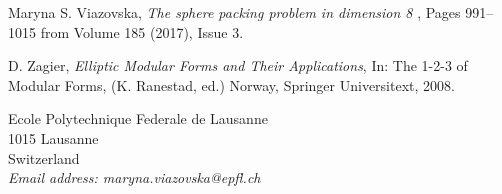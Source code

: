 \begin{thebibliography}{20}



 {\sc Maryna S. Viazovska}, {\em The sphere packing problem in dimension 8	},
Pages 991--1015 from Volume 185 (2017), Issue 3.

 {\sc D. Zagier}, {\em Elliptic Modular Forms and Their Applications}, In:  The 1-2-3 of Modular Forms, (K. Ranestad, ed.) Norway, Springer Universitext, 2008.
\end{thebibliography}

\newpage

{\footnotesize
\noindent
Ecole Polytechnique Federale de Lausanne\\
1015 Lausanne\\
Switzerland\\
{\it Email address: maryna.viazovska@epfl.ch}}
